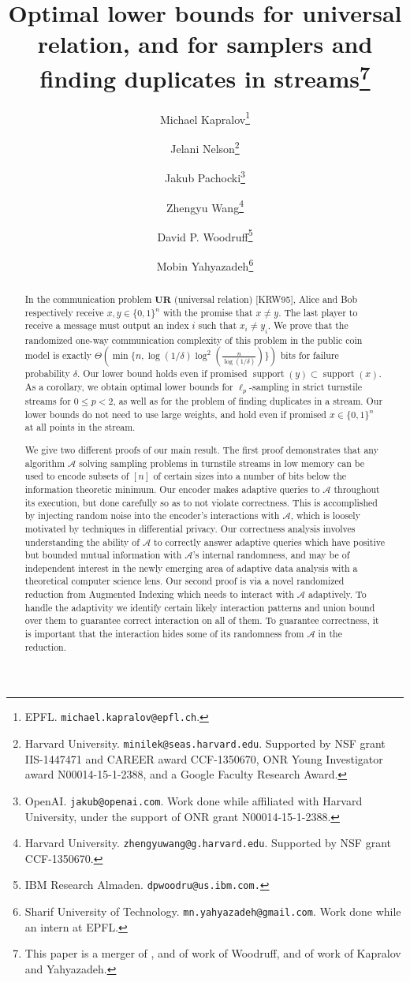 \documentclass[11pt]{article}
\title{Optimal lower bounds for universal relation, and for samplers and finding duplicates in streams\footnote{This paper is a merger of \cite{NelsonPW17}, and of work of Woodruff, and of work of Kapralov and Yahyazadeh.}}
\author{
  Michael Kapralov\thanks{EPFL. \texttt{michael.kapralov@epfl.ch}.}
  \and Jelani Nelson\thanks{Harvard University. \texttt{minilek@seas.harvard.edu}. Supported by NSF grant IIS-1447471 and
   CAREER award CCF-1350670, ONR Young Investigator award N00014-15-1-2388, and a Google Faculty Research Award.}
  \and Jakub Pachocki\thanks{OpenAI. \texttt{jakub@openai.com}. Work done while affiliated with Harvard University, under the support of ONR grant N00014-15-1-2388.}
  \and Zhengyu Wang\thanks{Harvard University. \texttt{zhengyuwang@g.harvard.edu}. Supported by NSF grant CCF-1350670.}
  \and David P. Woodruff\thanks{IBM Research Almaden. \texttt{dpwoodru@us.ibm.com.}}
  \and Mobin Yahyazadeh\thanks{Sharif University of Technology. \texttt{mn.yahyazadeh@gmail.com}. Work done while an intern at EPFL.}}
\newcommand{\ur}{\mathbf{UR}\xspace}
\begin{document}
\setcounter{page}{0}

\maketitle

\thispagestyle{empty}

\begin{abstract}
In the communication problem $\ur$ (universal relation) [KRW95], Alice and Bob respectively receive $x, y \in\{0,1\}^n$ with the promise that $x\neq y$. The last player to receive a message must output an index $i$ such that $x_i\neq y_i$. We prove that the randomized one-way communication complexity of this problem in the public coin model is exactly $\Theta(\min\{n,\log(1/\delta)\log^2(\frac n{\log(1/\delta)})\})$ bits for failure probability $\delta$. Our lower bound holds even if promised $\mathop{support}(y)\subset \mathop{support}(x)$. As a corollary, we obtain optimal lower bounds for $\ell_p$-sampling in strict turnstile streams for $0\le p < 2$, as well as for the problem of finding duplicates in a stream. Our lower bounds do not need to use large weights, and hold even if promised $x\in\{0,1\}^n$ at all points in the stream. 

We give two different proofs of our main result. The first proof demonstrates that any algorithm $\mathcal A$ solving sampling problems in turnstile streams in low memory can be used to encode subsets of $[n]$ of certain sizes into a number of bits below the information theoretic minimum. Our encoder makes adaptive queries to $\mathcal A$ throughout its execution, but done carefully so as to not violate correctness. This is accomplished by injecting random noise into the encoder's interactions with $\mathcal A$, which is loosely motivated by techniques in differential privacy. Our correctness analysis involves understanding the ability of $\mathcal A$ to correctly answer adaptive queries which have positive but bounded mutual information with $\mathcal A$'s internal randomness, and may be of independent interest in the newly emerging area of adaptive data analysis with a theoretical computer science lens. Our second proof is via a novel randomized reduction from Augmented Indexing \cite{MiltersenNSW98} which needs to interact with $\mathcal A$ adaptively. To handle the adaptivity we identify certain likely interaction patterns and union bound over them to guarantee correct interaction on all of them. To guarantee correctness, it is important that the interaction hides some of its randomness from $\mathcal A$ in the reduction.


\end{abstract}
\end{document}

